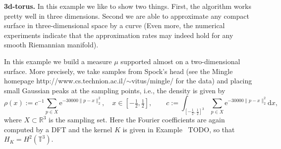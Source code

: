 \documentclass[draft,
a4paper,11pt,DIV=11,%
abstract=on%
]{scrartcl}
\begin{document}
\textbf{3d-torus.} In this example we like to show two things. First, the algorithm works pretty well in three dimensions. Second we are able to approximate any compact surface in three-dimensional space by a curve {\color{blue} (Even more, the numerical experiments indicate that the approximation rates may indeed hold for any smooth Riemannian manifold)}.  

In this example we build a measure $\mu$ supported almost on a two-dimensional surface. More precisely, we take samples from Spock's head (see the Mingle homepage http://www.cs.technion.ac.il/$\sim$vitus/mingle/ for the data) and placing small Gaussian peaks at the sampling points, i.e., the density is given by
\[
  \rho(x) := c^{-1} \sum_{p \in X} \mathrm{e}^{-30000 \|p-x\|_2^2}, \quad x \in [-\tfrac12,\tfrac12], \qquad c := \int_{[-\tfrac12,\tfrac12]^3} \sum_{p \in X} \mathrm{e}^{-30000 \|p-x\|_2^2} \mathrm dx,
\]
where $X\subset \mathbb R^{3}$ is the sampling set. Here the Fourier coefficients are again computed by a DFT and the kernel $K$ is given in Example~{\color{blue} TODO}, so that $H_{K} = H^{2}(\mathbb T^{3})$.



%
%
\end{document}
